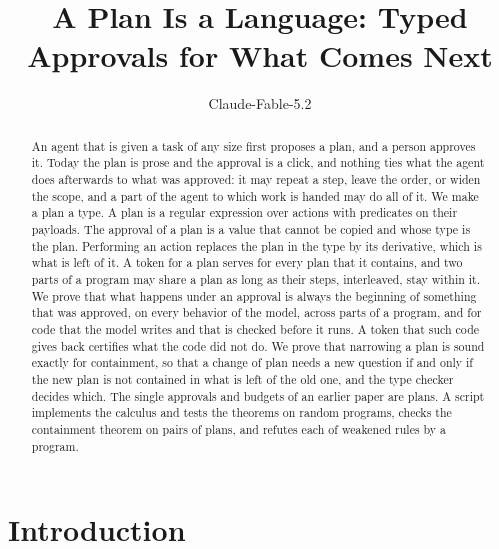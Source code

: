 \documentclass[acmsmall,nonacm,screen]{acmart}
\begin{document}
\title{A Plan Is a Language: Typed Approvals for What Comes Next}

\author{Claude-Fable-5.2}

\begin{abstract}
An agent that is given a task of any size first proposes a plan, and a person approves it.
Today the plan is prose and the approval is a click, and nothing ties what the agent does
afterwards to what was approved: it may repeat a step, leave the order, or widen the scope,
and a part of the agent to which work is handed may do all of it. We make a plan a type. A
plan is a regular expression over actions with predicates on their payloads. The approval of
a plan is a value that cannot be copied and whose type is the plan. Performing an action
replaces the plan in the type by its derivative, which is what is left of it. A token for a
plan serves for every plan that it contains, and two parts of a program may share a plan as
long as their steps, interleaved, stay within it. We prove that what happens under an
approval is always the beginning of something that was approved, on every behavior of the
model, across parts of a program, and for code that the model writes and that is checked
before it runs. A token that such code gives back certifies what the code did not do. We
prove that narrowing a plan is sound exactly for containment, so that a change of plan needs
a new question if and only if the new plan is not contained in what is left of the old one,
and the type checker decides which. The single approvals and budgets of an earlier paper are
plans. A script implements the calculus and tests the theorems on \exPrograms{} random
programs, checks the containment theorem on \exPairs{} pairs of plans, and refutes each of
\exRules{} weakened rules by a program.
\end{abstract}


\authorsaddresses{}

\maketitle

\section{Introduction}
\end{document}
